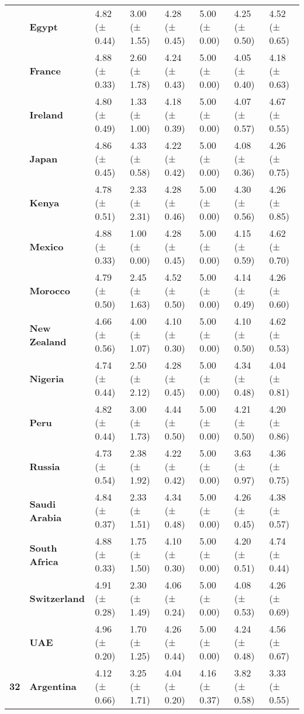 \begin{tabular}{llllllll}
\textbf{} & \textbf{Egypt} & 4.82 (± 0.44) & 3.00 (± 1.55) & 4.28 (± 0.45) & 5.00 (± 0.00) & 4.25 (± 0.50) & 4.52 (± 0.65) \\
\textbf{} & \textbf{France} & 4.88 (± 0.33) & 2.60 (± 1.78) & 4.24 (± 0.43) & 5.00 (± 0.00) & 4.05 (± 0.40) & 4.18 (± 0.63) \\
\textbf{} & \textbf{Ireland} & 4.80 (± 0.49) & 1.33 (± 1.00) & 4.18 (± 0.39) & 5.00 (± 0.00) & 4.07 (± 0.57) & 4.67 (± 0.55) \\
\textbf{} & \textbf{Japan} & 4.86 (± 0.45) & 4.33 (± 0.58) & 4.22 (± 0.42) & 5.00 (± 0.00) & 4.08 (± 0.36) & 4.26 (± 0.75) \\
\textbf{} & \textbf{Kenya} & 4.78 (± 0.51) & 2.33 (± 2.31) & 4.28 (± 0.46) & 5.00 (± 0.00) & 4.30 (± 0.56) & 4.26 (± 0.85) \\
\textbf{} & \textbf{Mexico} & 4.88 (± 0.33) & 1.00 (± 0.00) & 4.28 (± 0.45) & 5.00 (± 0.00) & 4.15 (± 0.59) & 4.62 (± 0.70) \\
\textbf{} & \textbf{Morocco} & 4.79 (± 0.50) & 2.45 (± 1.63) & 4.52 (± 0.50) & 5.00 (± 0.00) & 4.14 (± 0.49) & 4.26 (± 0.60) \\
\textbf{} & \textbf{New Zealand} & 4.66 (± 0.56) & 4.00 (± 1.07) & 4.10 (± 0.30) & 5.00 (± 0.00) & 4.10 (± 0.50) & 4.62 (± 0.53) \\
\textbf{} & \textbf{Nigeria} & 4.74 (± 0.44) & 2.50 (± 2.12) & 4.28 (± 0.45) & 5.00 (± 0.00) & 4.34 (± 0.48) & 4.04 (± 0.81) \\
\textbf{} & \textbf{Peru} & 4.82 (± 0.44) & 3.00 (± 1.73) & 4.44 (± 0.50) & 5.00 (± 0.00) & 4.21 (± 0.50) & 4.20 (± 0.86) \\
\textbf{} & \textbf{Russia} & 4.73 (± 0.54) & 2.38 (± 1.92) & 4.22 (± 0.42) & 5.00 (± 0.00) & 3.63 (± 0.97) & 4.36 (± 0.75) \\
\textbf{} & \textbf{Saudi Arabia} & 4.84 (± 0.37) & 2.33 (± 1.51) & 4.34 (± 0.48) & 5.00 (± 0.00) & 4.26 (± 0.45) & 4.38 (± 0.57) \\
\textbf{} & \textbf{South Africa} & 4.88 (± 0.33) & 1.75 (± 1.50) & 4.10 (± 0.30) & 5.00 (± 0.00) & 4.20 (± 0.51) & 4.74 (± 0.44) \\
\textbf{} & \textbf{Switzerland} & 4.91 (± 0.28) & 2.30 (± 1.49) & 4.06 (± 0.24) & 5.00 (± 0.00) & 4.08 (± 0.53) & 4.26 (± 0.69) \\
\textbf{} & \textbf{UAE} & 4.96 (± 0.20) & 1.70 (± 1.25) & 4.26 (± 0.44) & 5.00 (± 0.00) & 4.24 (± 0.48) & 4.56 (± 0.67) \\
\cline{1-8}
\multirow[t]{19}{*}{\textbf{32}} & \textbf{Argentina} & 4.12 (± 0.66) & 3.25 (± 1.71) & 4.04 (± 0.20) & 4.16 (± 0.37) & 3.82 (± 0.58) & 3.33 (± 0.55) \\

\end{tabular}
